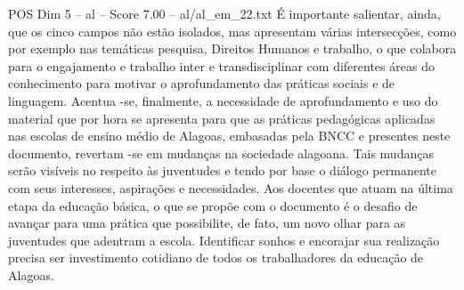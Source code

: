 \begin{textsample}{POS Dim 5 – al – Score 7.00 – al/al\_em\_22.txt}
É importante salientar, ainda, que os cinco campos não estão isolados, mas apresentam várias intersecções, como por exemplo nas temáticas pesquisa, Direitos Humanos e trabalho, o que colabora para o engajamento e trabalho inter e transdisciplinar com diferentes áreas do conhecimento para motivar o aprofundamento das práticas sociais e de linguagem.
Acentua -se, finalmente, a necessidade de aprofundamento e uso do material que por hora se apresenta para que as práticas pedagógicas aplicadas nas escolas de ensino médio de Alagoas, embasadas pela BNCC e presentes neste documento, revertam -se em mudanças na sociedade alagoana.
Tais mudanças serão visíveis no respeito às juventudes e tendo por base o diálogo permanente com seus interesses, aspirações e necessidades.
Aos docentes que atuam na última etapa da educação básica, o que se propõe com o documento é o desafio de avançar para uma prática que possibilite, de fato, um novo olhar para as juventudes que adentram a escola.
Identificar sonhos e encorajar sua realização precisa ser investimento cotidiano de todos os trabalhadores da educação de Alagoas.

\end{textsample}
